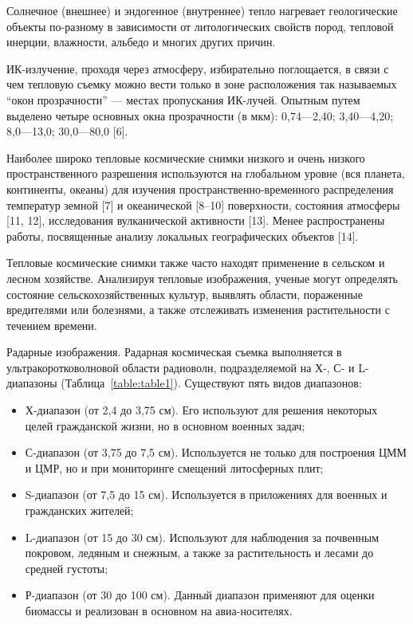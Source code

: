\documentclass[14pt, russian]{scrartcl}
\begin{document}
Солнечное (внешнее) и эндогенное (внутреннее) тепло нагревает геологические объекты по-разному в зависимости от литологических свойств пород, тепловой инерции, влажности, альбедо и многих других причин.

ИК-излучение, проходя через атмосферу, избирательно поглощается, в связи с чем тепловую съемку можно вести только в зоне расположения так называемых “окон прозрачности” — местах пропускания ИК-лучей. Опытным путем выделено четыре основных окна прозрачности (в мкм): 0,74—2,40; 3,40—4,20; 8,0—13,0; 30,0—80,0 [6].

Наиболее широко тепловые космические снимки низкого и очень низкого пространственного разрешения используются на глобальном уровне (вся планета, континенты, океаны) для изучения пространственно-временного распределения температур земной [7] и океанической [8–10] поверхности, состояния атмосферы [11, 12], исследования вулканической активности [13]. Менее распространены работы, посвященные анализу локальных географических объектов [14].

Тепловые космические снимки также часто находят применение в сельском и лесном хозяйстве. Анализируя тепловые изображения, ученые могут определять состояние сельскохозяйственных культур, выявлять области, пораженные вредителями или болезнями, а также отслеживать изменения растительности с течением времени.

Радарные изображения. Радарная космическая съемка выполняется в ультракоротковолновой области радиоволн, подразделяемой на Х-, С- и L- диапазоны (Таблица~\ref{table:table1}). Существуют пять видов диапазонов:

\begin{itemize}
    \item Х-диапазон (от 2,4 до 3,75 см). Его используют для решения некоторых целей гражданской жизни, но в основном военных задач;
    \item С-диапазон (от 3,75 до 7,5 см). Используется не только для построения ЦММ и ЦМР, но и при мониторинге смещений литосферных плит;
    \item S-диапазон (от 7,5 до 15 см). Используется в приложениях для военных и гражданских жителей;
    \item L-диапазон (от 15 до 30 см). Используют для наблюдения за почвенным покровом, ледяным и снежным, а также за растительность и лесами до средней густоты;
    \item Р-диапазон (от 30 до 100 см). Данный диапазон применяют для оценки биомассы и реализован в основном на авиа-носителях.
\end{itemize}
\end{document}
